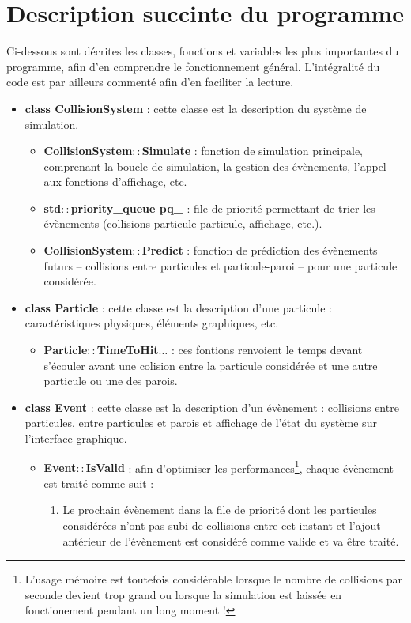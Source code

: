 \documentclass{tufte-handout}
\begin{document}
  \section{Description succinte du programme}
  Ci-dessous sont décrites les classes, fonctions et variables les plus importantes du programme, afin d'en comprendre le fonctionnement général. L'intégralité du code est par ailleurs commenté afin d'en faciliter la lecture.
  \begin{itemize}
    \item \textbf{class CollisionSystem} : cette classe est la description du système de simulation.
    \begin{itemize}
      \item \textbf{CollisionSystem$::$Simulate} : fonction de simulation principale, comprenant la boucle de simulation, la gestion des évènements, l'appel aux fonctions d'affichage, etc.

      \item \textbf{std$::$priority\_queue pq\_} : file de priorité permettant de trier les évènements (collisions particule-particule, affichage, etc.).

      \item \textbf{CollisionSystem$::$Predict} : fonction de prédiction des évènements futurs -- collisions entre particules et particule-paroi -- pour une particule considérée.
    \end{itemize}

    \item \textbf{class Particle} : cette classe est la description d'une particule : caractéristiques physiques, éléments graphiques, etc.
    \begin{itemize}
      \item \textbf{Particle$::$TimeToHit$\dots$} : ces fontions renvoient le temps devant s'écouler avant une colision entre la particule considérée et une autre particule ou une des parois.
    \end{itemize}

    \item \textbf{class Event} : cette classe est la description d'un évènement : collisions entre particules, entre particules et parois et affichage de l'état du système sur l'interface graphique.
    \begin{itemize}
      \item \textbf{Event$::$IsValid} : afin d'optimiser les performances\footnote{L'usage mémoire est toutefois considérable lorsque le nombre de collisions par seconde devient trop grand ou lorsque la simulation est laissée en fonctionement pendant un long moment !}, chaque évènement est traité comme suit :
      \begin{enumerate}
        \item Le prochain évènement dans la file de priorité dont les particules considérées n'ont pas subi de collisions entre cet instant et l'ajout antérieur de l'évènement est considéré comme valide et va être traité.


\end{enumerate}
\end{itemize}
\end{itemize}
\end{document}
